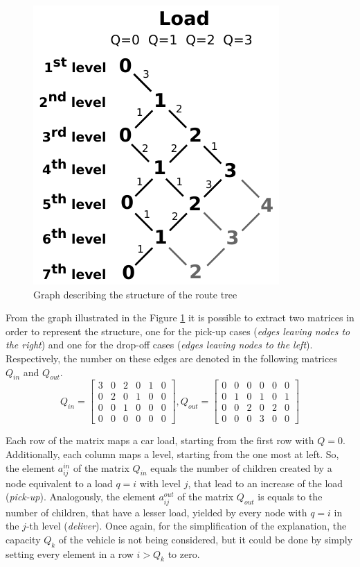 \documentclass[tuberlin,cic,tc,openright,english,noabntcite,oneside]{iiufrgs}
\begin{document}
\begin{figure}[H]
	\centering
    \caption{Graph describing the structure of the route tree}
    \includegraphics{fig_load_bus_scheme}\par
    \label{fig:load_bus_scheme}
\end{figure}

From the graph illustrated in the Figure \ref{fig:load_bus_scheme} it is possible to extract two matrices in order to represent the structure, one for the pick-up cases (\emph{edges leaving nodes to the right}) and one for the drop-off cases (\emph{edges leaving nodes to the left}). Respectively, the number on these edges are denoted in the following matrices $Q_{in}$ and $Q_{out}$.
$$
Q_{in} = 
\begin{bmatrix}
3 & 0 & 2 & 0 & 1 & 0\\
0 & 2 & 0 & 1 & 0 & 0\\
0 & 0 & 1 & 0 & 0 & 0\\
0 & 0 & 0 & 0 & 0 & 0
\end{bmatrix}
,
Q_{out} = 
\begin{bmatrix}
0 & 0 & 0 & 0 & 0 & 0\\
0 & 1 & 0 & 1 & 0 & 1\\
0 & 0 & 2 & 0 & 2 & 0\\
0 & 0 & 0 & 3 & 0 & 0
\end{bmatrix}
$$

Each row of the matrix maps a car load, starting from the first row with $Q=0$. Additionally, each column maps a level, starting from the one most at left. So, the element $a^{in}_{ij}$ of the matrix $Q_{in}$ equals the number of children created by a node equivalent to a load $q=i$ with level $j$, that lead to an increase of the load (\emph{pick-up}). Analogously, the element $a^{out}_{ij}$ of the matrix $Q_{out}$ is equals to the number of children, that have a lesser load, yielded by every node with $q=i$ in the $j$-th level (\emph{deliver}). Once again, for the simplification of the explanation, the capacity $Q_k$ of the vehicle is not being considered, but it could be done by simply setting every element in a row $i>Q_k$ to zero.
\end{document}
